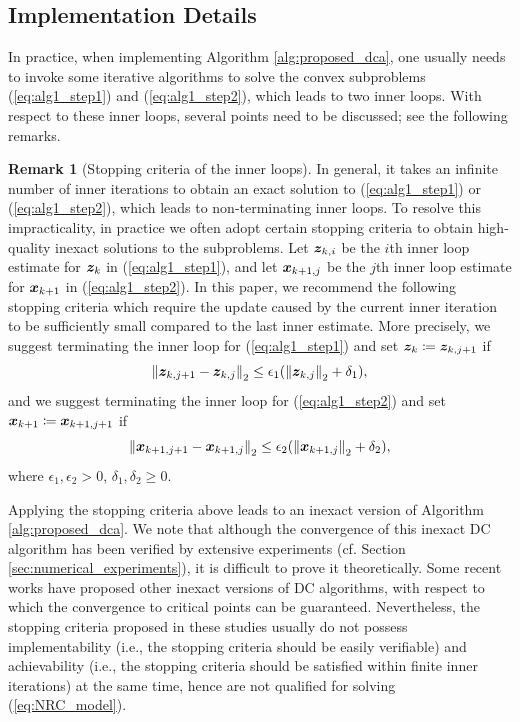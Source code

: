 \documentclass[lettersize,journal]{IEEEtran}
\theoremstyle{plain}%
\theoremstyle{definition}
\newtheorem{remark}{Remark}
\theoremstyle{remark}
\begin{document}
\subsection{Implementation Details}
In practice, when implementing Algorithm \ref{alg:proposed_dca}, one usually needs to invoke some iterative algorithms to solve the convex subproblems (\ref{eq:alg1_step1}) and (\ref{eq:alg1_step2}), which leads to two inner loops. With respect to these inner loops, several points need to be discussed; see the following remarks.

\begin{remark}[Stopping criteria of the inner loops]\label{remark:termination_rules}
In general, it takes an infinite number of inner iterations to obtain an exact solution to (\ref{eq:alg1_step1}) or (\ref{eq:alg1_step2}), which leads to non-terminating inner loops. To resolve this impracticality, in practice we often adopt certain stopping criteria to obtain high-quality inexact solutions to the subproblems. Let $\bm{z}_{k,i}$ be the $i$th inner loop estimate for $\bm{z}_k$ in (\ref{eq:alg1_step1}), and let $\bm{x}_{k+1,j}$ be the $j$th inner loop estimate for $\bm{x}_{k+1}$ in (\ref{eq:alg1_step2}). In this paper, we recommend the following stopping criteria which require the update caused by the current inner iteration to be sufficiently small compared to the last inner estimate. More precisely, we suggest terminating the inner loop for (\ref{eq:alg1_step1}) and set $\bm{z}_k\coloneqq \bm{z}_{k,j+1}$ if 
\begin{equation*}
\left\| \bm{z}_{k,j+1}-\bm{z}_{k,j} \right\|_2\leq \epsilon_1(\left\| \bm{z}_{k,j} \right\|_2+\delta_1),
\end{equation*}
and we suggest terminating the inner loop for (\ref{eq:alg1_step2}) and set $\bm{x}_{k+1}\coloneqq \bm{x}_{k+1,j+1}$ if 
\begin{equation*}
\left\| \bm{x}_{k+1,j+1}-\bm{x}_{k+1,j} \right\|_2\leq \epsilon_2(\left\| \bm{x}_{k+1,j} \right\|_2+\delta_2),
\end{equation*}
where $\epsilon_1,\epsilon_2>0$, $\delta_1,\delta_2\geq 0$.
\end{remark}

Applying the stopping criteria above leads to an inexact version of Algorithm \ref{alg:proposed_dca}. We note that although the convergence of this inexact DC algorithm has been verified by extensive experiments (cf. Section \ref{sec:numerical_experiments}), it is difficult to prove it theoretically. Some recent works \cite{souza2016,deoliveira2019,lu2019} have proposed other inexact versions of DC algorithms, with respect to which the convergence to critical points can be guaranteed. Nevertheless, the stopping criteria proposed in these studies usually do not possess implementability (i.e., the stopping criteria should be easily verifiable) and achievability (i.e., the stopping criteria should be satisfied within finite inner iterations) at the same time, hence are not qualified for solving (\ref{eq:NRC_model}).
\end{document}
